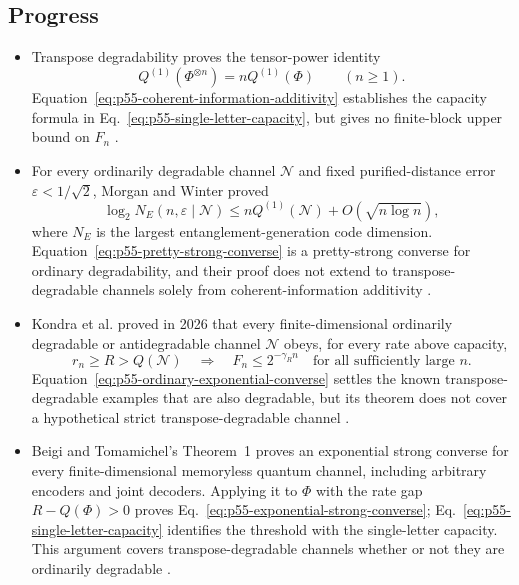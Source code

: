 \subsection*{Progress}

\begin{itemize}
  \item Transpose degradability proves the tensor-power identity
  \begin{equation}
    Q^{(1)}(\Phi^{\otimes n})=nQ^{(1)}(\Phi)
    \qquad(n\geq1).
    \label{eq:p55-coherent-information-additivity}
  \end{equation}
  Equation~\eqref{eq:p55-coherent-information-additivity} establishes the
  capacity formula in Eq.~\eqref{eq:p55-single-letter-capacity}, but gives no
  finite-block upper bound on $F_n$
  .

  \item For every ordinarily degradable channel $\mathcal N$ and fixed
  purified-distance error $\varepsilon<1/\sqrt2$, Morgan and Winter proved
  \begin{equation}
    \log_2 N_E(n,\varepsilon\mid\mathcal N)
      \leq nQ^{(1)}(\mathcal N)+O(\sqrt{n\log n}),
    \label{eq:p55-pretty-strong-converse}
  \end{equation}
  where $N_E$ is the largest entanglement-generation code dimension.
  Equation~\eqref{eq:p55-pretty-strong-converse} is a pretty-strong converse
  for ordinary degradability, and their proof does not extend to
  transpose-degradable channels solely from coherent-information additivity
  .

  \item Kondra et al. proved in 2026 that every finite-dimensional ordinarily
  degradable or antidegradable channel $\mathcal N$ obeys, for every rate above
  capacity,
  \begin{equation}
    r_n\geq R>Q(\mathcal N)
    \quad\Longrightarrow\quad
    F_n\leq2^{-\gamma_R n}
    \quad\text{for all sufficiently large }n.
    \label{eq:p55-ordinary-exponential-converse}
  \end{equation}
  Equation~\eqref{eq:p55-ordinary-exponential-converse} settles the known
  transpose-degradable examples that are also degradable, but its theorem does
  not cover a hypothetical strict transpose-degradable channel
  .

  \item Beigi and Tomamichel's Theorem~1 proves an exponential strong converse for every finite-dimensional memoryless quantum channel, including arbitrary encoders and joint decoders. Applying it to $\Phi$ with the rate gap $R-Q(\Phi)>0$ proves Eq.~\eqref{eq:p55-exponential-strong-converse}; Eq.~\eqref{eq:p55-single-letter-capacity} identifies the threshold with the single-letter capacity. This argument covers transpose-degradable channels whether or not they are ordinarily degradable .


\end{itemize}
